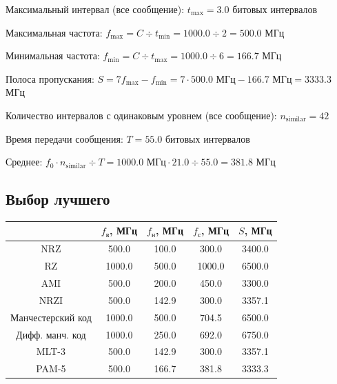 Максимальный интервал (все сообщение): $t_\mathrm{max}=3.0$ битовых интервалов

Максимальная частота: $f_\mathrm{max}=C\div t_\mathrm{min}=1000.0\div 2=500.0$ МГц

Минимальная частота: $f_\mathrm{min}=C\div t_\mathrm{max}=1000.0\div 6=166.7$ МГц

Полоса пропускания: $S=7f_\mathrm{max}-f_\mathrm{min} = 7\cdot 500.0\text{ МГц}-166.7\text{ МГц}=3333.3$ МГц

Количество интервалов с одинаковым уровнем (все сообщение): $n_\mathrm{similar}=42$

Время передачи сообщения: $T=55.0$ битовых интервалов

Среднее: $f_0\cdot n_\mathrm{similar}\div T=1000.0\text{ МГц}\cdot 21.0\div 55.0=381.8$ МГц

\subsection{Выбор лучшего}
\begin{center}
    \begin{tabular}{c|cccc}
        & $f_\mathrm{\text{в}}$, МГц
        & $f_\mathrm{\text{н}}$, МГц
        & $f_\mathrm{\text{с}}$, МГц
        & $S$, МГц \\ \hline
        NRZ               &  500.0 & 100.0 &  300.0 & 3400.0 \\
        RZ                & 1000.0 & 500.0 & 1000.0 & 6500.0 \\
        AMI               &  500.0 & 200.0 &  450.0 & 3300.0 \\
        NRZI              &  500.0 & 142.9 &  300.0 & 3357.1 \\
        Манчестерский код & 1000.0 & 500.0 &  704.5 & 6500.0 \\
        Дифф. манч. код   & 1000.0 & 250.0 &  692.0 & 6750.0 \\
        MLT-3             &  500.0 & 142.9 &  300.0 & 3357.1 \\
        PAM-5             &  500.0 & 166.7 &  381.8 & 3333.3 \\
    \end{tabular}
\end{center}

